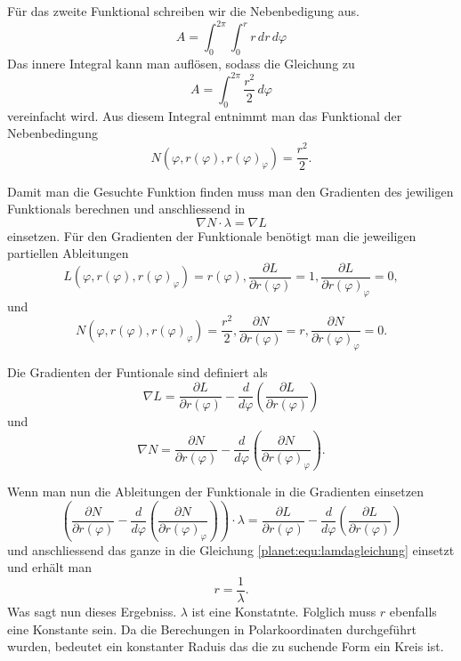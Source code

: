 Für das zweite Funktional schreiben wir die Nebenbedigung aus.
\begin{equation*}
	A = \int_{0}^{2\pi}\int_{0}^{r} r \, dr \, d\varphi
\end{equation*}
Das innere Integral kann man auflösen, sodass die Gleichung zu
\begin{equation*}
	A = \int_{0}^{2\pi}\frac{r^2}{2} \, d\varphi
\end{equation*}
vereinfacht wird.
Aus diesem Integral entnimmt man das Funktional der Nebenbedingung
\begin{equation*}
	N(\varphi ,r(\varphi),r(\varphi)_\varphi) = \frac{r^2}{2}.
\end{equation*}

Damit man die Gesuchte Funktion finden muss man den Gradienten des jewiligen Funktionals berechnen und anschliessend in
\begin{equation}
	\nabla N \cdot \lambda = \nabla L
	\label{planet:equ:lamdagleichung}
\end{equation}
einsetzen.
Für den Gradienten der Funktionale benötigt man die jeweiligen partiellen Ableitungen
\begin{equation*}
	L(\varphi ,r(\varphi),r(\varphi)_\varphi) = r(\varphi),
	\frac{\partial L}{\partial r(\varphi)} = 1,
	\frac{\partial L}{\partial r(\varphi)_\varphi} = 0,
\end{equation*}
und
\begin{equation*}
	N(\varphi ,r(\varphi),r(\varphi)_\varphi) = \frac{r^2}{2} ,
	\frac{\partial N}{\partial r(\varphi)} = r,
	\frac{\partial N}{\partial r(\varphi)_\varphi} = 0.
\end{equation*}

Die Gradienten der Funtionale sind definiert als 
\begin{equation*}
	\nabla L = 
	\frac{\partial L}{\partial r(\varphi)}-  \frac{d}{d\varphi}\left( \frac{\partial L}{\partial r(\varphi)} \right)
\end{equation*}
und
\begin{equation*}
	\nabla N = \frac{\partial N}{\partial r(\varphi)} - \frac{d}{d\varphi}\left(\frac{\partial N}{\partial r(\varphi)_\varphi}\right).
\end{equation*}

Wenn man nun die Ableitungen der Funktionale in die Gradienten einsetzen
\begin{equation*}
	\left(\frac{\partial N}{\partial r(\varphi)} - \frac{d}{d\varphi}\left(\frac{\partial N}{\partial r(\varphi)_\varphi}\right)\right)\cdot \lambda = \frac{\partial L}{\partial r(\varphi)}-  \frac{d}{d\varphi}\left( \frac{\partial L}{\partial r(\varphi)} \right)
\end{equation*} 
und anschliessend das ganze in die Gleichung \ref{planet:equ:lamdagleichung}
einsetzt und erhält man
\begin{equation*}
	r = \frac{1}{\lambda}.
\end{equation*}
Was sagt nun dieses Ergebniss.
\(\lambda\) ist eine Konstatnte.
Folglich muss \(r\) ebenfalls eine Konstante sein.
Da die Berechungen in Polarkoordinaten durchgeführt wurden, bedeutet ein konstanter Raduis das die zu suchende Form ein Kreis ist.

